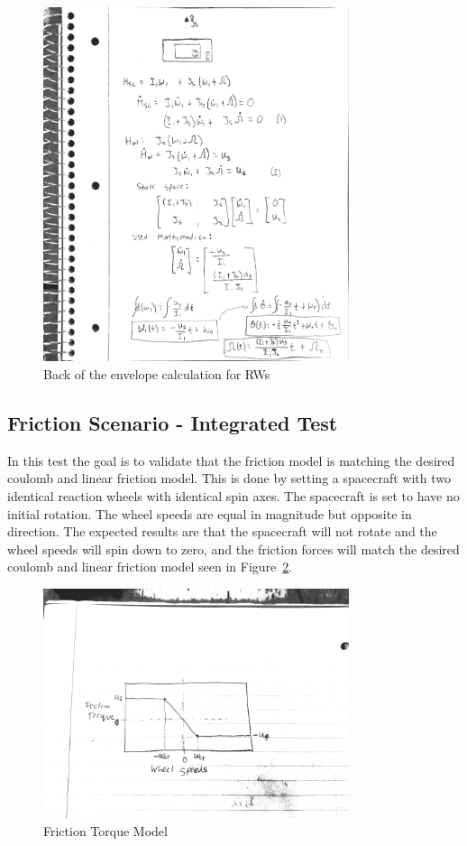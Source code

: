\begin{figure}[htbp]
	\centerline{
		\includegraphics[width=0.8\textwidth]{Figures/BOE}}
	\caption{Back of the envelope calculation for RWs}
	\label{fig:BOE}
\end{figure}

\clearpage

\subsection{Friction Scenario - Integrated Test}

In this test the goal is to validate that the friction model is matching the desired coulomb and linear friction model. This is done by setting a spacecraft with two identical reaction wheels with identical spin axes. The spacecraft is set to have no initial rotation. The wheel speeds are equal in magnitude but opposite in direction. The expected results are that the spacecraft will not rotate and the wheel speeds will spin down to zero, and the friction forces will match the desired coulomb and linear friction model seen in Figure~\ref{fig:FrictionTorque}.

\begin{figure}[htbp]
	\centerline{
		\includegraphics[width=0.8\textwidth]{Figures/FrictionTorque}}
	\caption{Friction Torque Model}
	\label{fig:FrictionTorque}
\end{figure}

